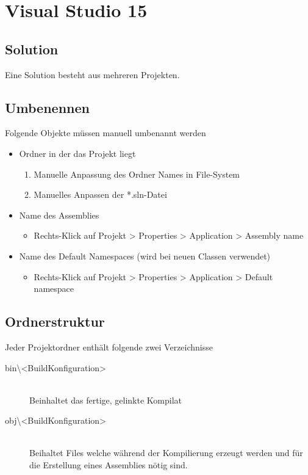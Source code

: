 \section{Visual Studio 15}
\subsection{Solution}
Eine Solution besteht aus mehreren Projekten.

\subsection{Umbenennen}
Folgende Objekte müssen manuell umbenannt werden
\begin{itemize}
	\item Ordner in der das Projekt liegt 
	\begin{enumerate}
		\item Manuelle Anpassung des Ordner Names in File-System
		\item  Manuelles Anpassen der *.sln-Datei
	\end{enumerate}
	\item Name des Assemblies
	\begin{itemize}
		\item Rechts-Klick auf Projekt > Properties > Application > Assembly name
	\end{itemize}
	\item Name des Default Namespaces (wird bei neuen Classen verwendet)
	\begin{itemize}
		\item Rechts-Klick auf Projekt > Properties > Application > Default namespace
	\end{itemize}
\end{itemize}

\subsection{Ordnerstruktur}
Jeder Projektordner enthält folgende zwei Verzeichnisse
\begin{description}
	\item[bin\textbackslash<BuildKonfiguration>] \hfill \\
	Beinhaltet das fertige, gelinkte Kompilat
	\item[obj\textbackslash<BuildKonfiguration>] \hfill \\
	Beihaltet Files welche während der Kompilierung erzeugt werden und für die Erstellung eines Assemblies nötig sind.
\end{description}



